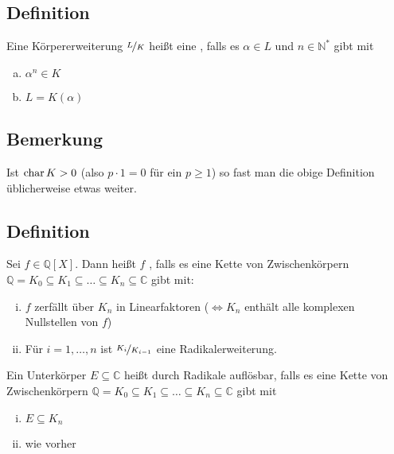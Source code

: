 
\subsection[Definition: Radikalerweiterung]{Definition} %
\label{sub:12.7}
Eine Körpererweiterung $\nicefrac{L}{K}$ heißt eine , falls es $\alpha \in L$ und $n \in \mathds{N}^*$ gibt mit 
\begin{multicols}{2}
	\begin{enumerate}[a)]
		\item $\alpha^n \in K$
		\item $L= K(\alpha)$
	\end{enumerate}
\end{multicols}

\subsection[Bemerkung für Körper mit $\Char K >0$]{Bemerkung} %
\label{sub:12.8}
Ist $\Char K >0$ (also $p \cdot 1 = 0$ für ein $p \ge 1$) so fast man die obige Definition üblicherweise etwas weiter.

\subsection[Definition: Durch Radikale auflösbar]{Definition} %
\label{sub:12.9}
Sei $f \in \mathds{Q}[X]$. Dann heißt $f$ , falls es eine Kette von Zwischenkörpern  $\mathds{Q}= K_0 \subseteq K_1 \subseteq  \ldots  \subseteq K_n \subseteq \mathds{C}$ gibt mit: 
\begin{enumerate}[(i)]
	\item $f$ zerfällt über $K_n$ in Linearfaktoren ($\Leftrightarrow K_n$ enthält alle komplexen Nullstellen von $f$)
	\item Für $i=1, \ldots ,n$ ist $\nicefrac{K_i}{K_{i-1}}$ eine Radikalerweiterung.
\end{enumerate}
Ein Unterkörper $E \subseteq \mathds{C}$ heißt durch Radikale auflösbar, falls es eine Kette von Zwischenkörpern $\mathds{Q}= K_0 \subseteq K_1 \subseteq \ldots \subseteq K_n \subseteq \mathds{C}$ gibt mit 
\begin{multicols}{2}
	\begin{enumerate}[(i)]
		\item $E \subseteq K_n$
		\item wie vorher
	\end{enumerate}
\end{multicols}

